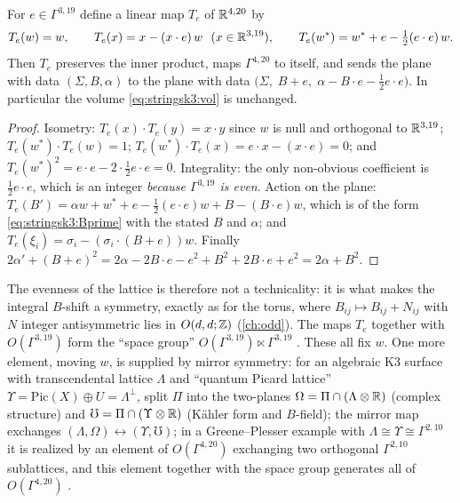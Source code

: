 \begin{proposition}\label{thm:stringsk3:bshift}
For $e\in\Gamma^{3,19}$ define a linear map $T_e$ of $\mathbb{R}^{4,20}$ by
\begin{equation}\label{eq:stringsk3:Te}
  T_e(w)=w,\qquad T_e(x)=x-(x\cdot e)\,w\ \ (x\in\mathbb{R}^{3,19}),\qquad
  T_e(w^*)=w^*+e-\tfrac12(e\cdot e)\,w .
\end{equation}
Then $T_e$ preserves the inner product, maps $\Gamma^{4,20}$ to itself, and sends the plane
with data $(\Sigma,B,\alpha)$ to the plane with data
$\big(\Sigma,\;B+e,\;\alpha-B\cdot e-\tfrac12e\cdot e\big)$. In particular the volume
\eqref{eq:stringsk3:vol} is unchanged.
\end{proposition}
\begin{proof}
Isometry: $T_e(x)\cdot T_e(y)=x\cdot y$ since $w$ is null and orthogonal to $\mathbb{R}^{3,19}$;
$T_e(w^*)\cdot T_e(w)=1$; $T_e(w^*)\cdot T_e(x)=e\cdot x-(x\cdot e)=0$; and
$T_e(w^*)^2=e\cdot e-2\cdot\tfrac12e\cdot e=0$. Integrality: the only non-obvious coefficient
is $\tfrac12e\cdot e$, which is an integer \emph{because $\Gamma^{3,19}$ is even}. Action on
the plane: $T_e(B')=\alpha w+w^*+e-\tfrac12(e\cdot e)w+B-(B\cdot e)w$, which is of the form
\eqref{eq:stringsk3:Bprime} with the stated $B$ and $\alpha$; and
$T_e(\xi_i)=\sigma_i-(\sigma_i\cdot(B+e))w$. Finally
$2\alpha'+(B+e)^2=2\alpha-2B\cdot e-e^2+B^2+2B\cdot e+e^2=2\alpha+B^2$.
\end{proof}

The evenness of the lattice is therefore not a technicality: it is what makes the integral
$B$-shift a symmetry, exactly as for the torus, where $B_{ij}\mapsto B_{ij}+N_{ij}$ with $N$
integer antisymmetric lies in $O(d,d;\mathbb{Z})$ (\cref{ch:odd}). The maps $T_e$ together with
$O(\Gamma^{3,19})$ form the ``space group'' $O(\Gamma^{3,19})\ltimes\Gamma^{3,19}$
. These all fix $w$. One more element, moving $w$, is
supplied by mirror symmetry: for an algebraic K3 surface with transcendental lattice $\Lambda$
and ``quantum Picard lattice'' $\Upsilon=\mathrm{Pic}(X)\oplus U=\Lambda^\perp$, split $\Pi$ into
the two-planes $\Omega=\Pi\cap(\Lambda\otimes\mathbb{R})$ (complex structure) and
$\mho=\Pi\cap(\Upsilon\otimes\mathbb{R})$ (K\"ahler form and $B$-field); the mirror map exchanges
$(\Lambda,\Omega)\leftrightarrow(\Upsilon,\mho)$; in a Greene--Plesser example with $\Lambda\cong\Upsilon\cong\Gamma^{2,10}$ it is
realized by an element of $O(\Gamma^{4,20})$ exchanging two orthogonal $\Gamma^{2,10}$
sublattices, and this element together with the space group generates all of
$O(\Gamma^{4,20})$ .

